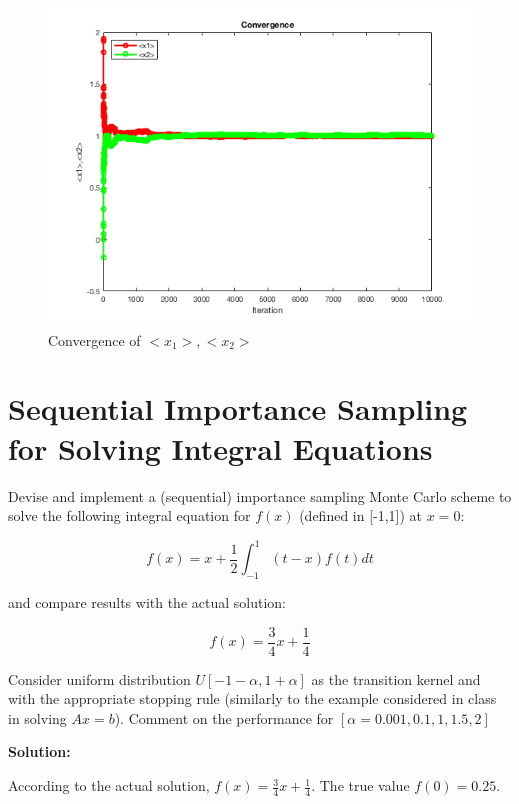 \documentclass{article}
\begin{document}
\begin{figure}[h!]
\centering
\includegraphics[scale=0.5]{HW5P3_5.png}
\caption{Convergence of $<x_{1}>, <x_{2}>$}
\end{figure}




\newpage
\section{Sequential Importance Sampling for Solving Integral Equations}
Devise and implement a (sequential) importance sampling Monte Carlo scheme to solve the following integral equation for $f(x)$ (defined in [-1,1]) at $x=0$:

\begin{equation}
    f(x) = x+\frac{1}{2}\int^{1}_{-1}(t-x)f(t)dt
\end{equation}

and compare results with the actual solution:

\begin{equation}
    f(x) = \frac{3}{4}x+\frac{1}{4}
\end{equation}

Consider uniform distribution $U[-1-\alpha,1+\alpha]$ as the transition kernel and with the appropriate stopping rule (similarly to the example considered in class in solving $Ax=b$). Comment on the performance for $[\alpha=0.001,0.1,1,1.5,2]$

\textbf{Solution:}

According to the actual solution, $f(x) = \frac{3}{4}x+\frac{1}{4}$. 
The true value $f(0) = 0.25$. 
\end{document}
